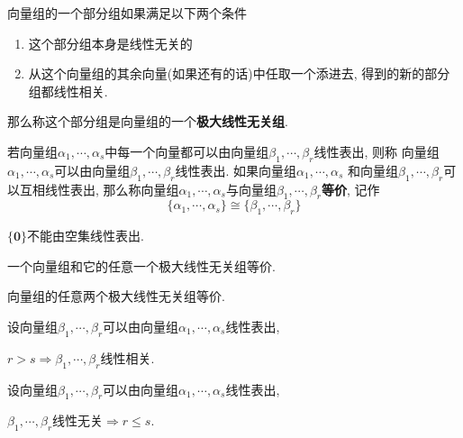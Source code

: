 \begin{Definition}[极大线性无关组]
向量组的一个部分组如果满足以下两个条件
\begin{enumerate}[(1)]
\item 这个部分组本身是线性无关的
\item 从这个向量组的其余向量(如果还有的话)中任取一个添进去, 得到的新的部分组都线性相关.
\end{enumerate}
那么称这个部分组是向量组的一个\textbf{极大线性无关组}.
\end{Definition}

\begin{Definition}
若向量组$\alpha_1, \cdots, \alpha_s$中每一个向量都可以由向量组$\beta_1, \cdots, \beta_r$线性表出, 则称
向量组$\alpha_1, \cdots, \alpha_s$可以由向量组$\beta_1,\cdots, \beta_r$线性表出. 如果向量组$\alpha_1, \cdots, \alpha_s$
和向量组$\beta_1, \cdots, \beta_r$可以互相线性表出, 那么称向量组$\alpha_1, \cdots, \alpha_s$与向量组$\beta_1, \cdots, \beta_r$\textbf{等价}, 记作
$$\{ \alpha_1, \cdots, \alpha_s \} \cong \{ \beta_1, \cdots, \beta_r \}$$

\end{Definition}

\begin{Remark}
$\{ \mathbf{0} \}$不能由空集线性表出.
\end{Remark}

\begin{Proposition}[!]
一个向量组和它的任意一个极大线性无关组等价.
\end{Proposition}

\begin{Corollary}
向量组的任意两个极大线性无关组等价.
\end{Corollary}


\begin{Lemma}[!!]
设向量组$\beta_1, \cdots, \beta_r$可以由向量组$\alpha_1, \cdots, \alpha_s$线性表出, 
\begin{tightcenter}
$r > s \Rightarrow \beta_1, \cdots, \beta_r$线性相关.
\end{tightcenter}
\end{Lemma}

\begin{Corollary}
设向量组$\beta_1, \cdots, \beta_r$可以由向量组$\alpha_1, \cdots, \alpha_s$线性表出, 
\begin{tightcenter}
$\beta_1, \cdots, \beta_r$线性无关$\Rightarrow r \le s$.
\end{tightcenter}
\end{Corollary}

